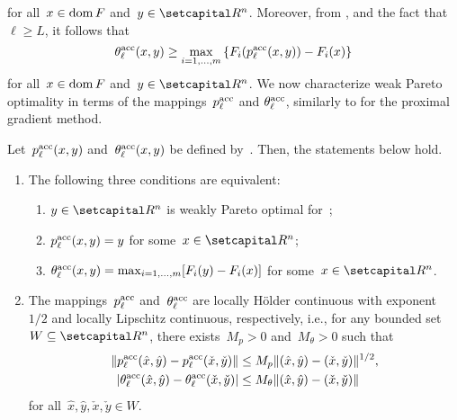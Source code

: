 \documentclass[../main]{subfiles}
\begin{document}
for all~$x \in \operatorname{dom} F$ and~$y \in \setR^n$.
Moreover, from , and the fact that~$\ell \ge L$, it follows that
\begin{equation} \label{eq:acc approx ineq}
    \theta^{\mathrm{acc}}_\ell(x, y) \ge \max_{i = 1, \dots, m}\left\{ F_i(p^{\mathrm{acc}}_\ell(x, y)) - F_i(x) \right\}
\end{equation}
for all~$x \in \operatorname{dom} F$ and~$y \in \setR^n$.
We now characterize weak Pareto optimality in terms of the mappings~$p^{\mathrm{acc}}_\ell$ and $\theta^{\mathrm{acc}}_\ell$, similarly to  for the proximal gradient method.
\begin{proposition} 
    Let~$p^{\mathrm{acc}}_\ell(x, y)$ and~$\theta^{\mathrm{acc}}_\ell(x, y)$ be defined by~.
    Then, the statements below hold.
    \begin{enumerate}
        \item The following three conditions are equivalent: 
            \begin{enumerate}
                \item $y \in \setR^n$ is weakly Pareto optimal for~;
                \item $p^{\mathrm{acc}}_\ell(x, y) = y$ for some~$x \in \setR^n$;
                \item $\theta^{\mathrm{acc}}_\ell(x, y) = \max_{i = 1, \dots, m} [ F_i(y) - F_i(x) ]$ for some~$x \in \setR^n$.
            \end{enumerate}
        \item The mappings~$p^{\mathrm{acc}}_\ell$ and~$\theta^{\mathrm{acc}}_\ell$ are locally H\"{o}lder continuous with exponent~$1 / 2$ and locally Lipschitz continuous, respectively, i.e., for any bounded set~$W \subseteq \setR^n$, there exists~$M_p > 0$ and~$M_\theta > 0$ such that
            \begin{align}
                \lVert p^{\mathrm{acc}}_\ell(\hat{x}, \hat{y}) - p^{\mathrm{acc}}_\ell(\check{x}, \check{y})\rVert &\le M_p \lVert(\hat{x}, \hat{y}) - (\check{x}, \check{y})\rVert^{1 / 2}, \\
                \lvert\theta^{\mathrm{acc}}_\ell(\hat{x}, \hat{y}) - \theta^{\mathrm{acc}}_\ell(\check{x}, \check{y})\rvert &\le  M_\theta \lVert(\hat{x}, \hat{y}) - (\check{x}, \check{y})\rVert
            \end{align}
            for all~$\hat{x}, \hat{y}, \check{x}, \check{y} \in W$. 
    \end{enumerate}
\end{proposition}
\end{document}
